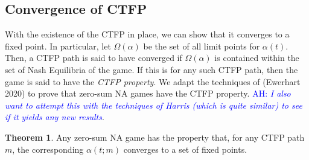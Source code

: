 \documentclass{article}
\theoremstyle{definition}
\newtheorem{theorem}{Theorem}
\newcommand{\ah}[1]{\textcolor{blue}{AH: \textit{#1}}}
\begin{document}
\subsection{Convergence of CTFP}

With the existence of the CTFP in place, we can show that it converges
to a fixed point. In particular, let $\Omega(\alpha)$ be the set of
all limit points for $\alpha(t)$. Then, a CTFP path is said to have
converged if $\Omega(\alpha)$ is contained within the set of Nash
Equilibria of the game. If this is for any such CTFP path, then the
game is said to have the \emph{CTFP property}. We adapt the techniques
of (Ewerhart 2020) to prove that zero-sum NA games have the CTFP
property. \ah{I also want to attempt this with the techniques of
  Harris (which is quite similar) to see if it yields any new
  results}.

  \begin{theorem}
    Any zero-sum NA game has the property that, for any CTFP path $m$, the corresponding $\alpha(t; m)$ converges to a set of fixed points.
  \end{theorem}
\end{document}
